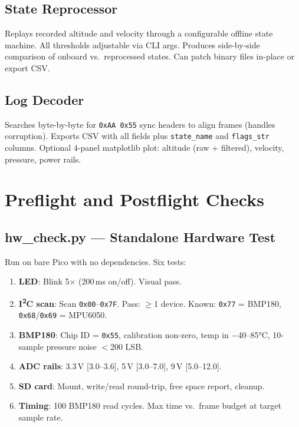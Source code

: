 \documentclass[11pt, a4paper, twoside]{article}
\newcommand{\hex}[1]{\texttt{0x#1}}
\begin{document}
\subsection{State Reprocessor}
Replays recorded altitude and velocity through a configurable offline state machine. All thresholds adjustable via CLI args. Produces side-by-side comparison of onboard vs.\ reprocessed states. Can patch binary files in-place or export CSV.

\subsection{Log Decoder}
Searches byte-by-byte for \texttt{0xAA\,0x55} sync headers to align frames (handles corruption). Exports CSV with all fields plus \texttt{state\_name} and \texttt{flags\_str} columns. Optional 4-panel matplotlib plot: altitude (raw + filtered), velocity, pressure, power rails.

\section{Preflight and Postflight Checks}
\label{sec:checks}

\subsection{hw\_check.py --- Standalone Hardware Test}
\label{sec:hwcheck}

Run on bare Pico with no dependencies. Six tests:

\begin{enumerate}
    \item \textbf{LED}: Blink 5$\times$ (200\,ms on/off). Visual pass.
    \item \textbf{I\textsuperscript{2}C scan}: Scan \hex{00}--\hex{7F}. Pass: $\geq$1 device. Known: \hex{77} = BMP180, \hex{68}/\hex{69} = MPU6050.
    \item \textbf{BMP180}: Chip ID = \hex{55}, calibration non-zero, temp in $-$40--85\si{\degreeCelsius}, 10-sample pressure noise $<$200 LSB.
    \item \textbf{ADC rails}: 3.3\,V [3.0--3.6], 5\,V [3.0--7.0], 9\,V [5.0--12.0].
    \item \textbf{SD card}: Mount, write/read round-trip, free space report, cleanup.
    \item \textbf{Timing}: 100 BMP180 read cycles. Max time vs.\ frame budget at target sample rate.
\end{enumerate}
\end{document}
